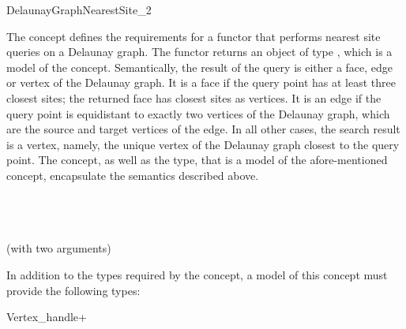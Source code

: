 
\begin{ccRefFunctionObjectConcept}{DelaunayGraphNearestSite_2}

The  concept defines the requirements
for a functor that performs nearest site queries on a Delaunay
graph. The functor returns an object of type , which
is a model of the 
concept. Semantically, the result of the query is either a face, edge or
vertex of the Delaunay graph. It is a face if the query point has at
least three closest sites; the returned face has closest sites as
vertices. It is an edge if the query
point is equidistant to exactly two vertices of the Delaunay graph,
which are the source and target vertices of the edge. In all other
cases, the search result is a vertex, namely, the unique vertex of the
Delaunay graph closest to the query point. The
 concept, as well as the
 type, that is a model of the afore-mentioned concept,
encapsulate the semantics described above.

\ccRefines
{}\\
\\
\\
 (with two arguments)

\ccTypes

In addition to the types required by the 
concept, a model of this concept must provide the following types:


\ccGlue
{}
{}
{Vertex_handle+}{}
\ccThreeToTwo
{}
\ccGlue
{}
\ccGlue
{}
\ccGlue
{}


\end{ccRefFunctionObjectConcept}
